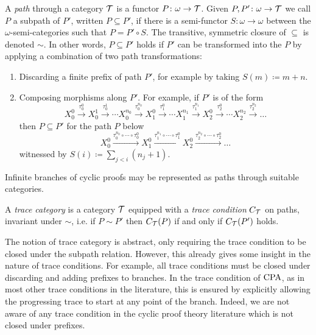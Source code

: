 A \emph{path} through a category $\mathcal{T}$ is a functor $P \colon \omega \to \mathcal{T}$.
Given $P, P' \colon \omega \to \mathcal{T}$ we call $P$ a subpath of $P'$, written  $P \subseteq
  P'$, if there is a semi-functor $S \colon \omega \to \omega$ between the $\omega$-semi-categories such that $P = P'
  \circ S$. The transitive, symmetric closure of $\subseteq$ is
  denoted $\sim$.
In other words, $P \subseteq P'$ holds if $P'$ can be transformed
  into the $P$ by applying a combination of two path transformations:
  \begin{enumerate}
  \item 
    Discarding a finite prefix of path $P'$, for example by taking $S(m) \coloneq m + n$.
  \item 
    Composing morphisms along $P'$. For example, if $P'$ is of the form
    \[X_0^0 \xrightarrow{\tau^0_0} X_0^1 \xrightarrow{\tau^1_0} \cdots
      X_0^{n_0} \xrightarrow{\tau_0^{n_0}} X_1^0 \xrightarrow{\tau_1^0} \cdots X_1^{n_1}
      \xrightarrow{\tau_1^{n_1}} X_2^0 \xrightarrow{\tau_2^0} \cdots X_2^{n_2} \xrightarrow{\tau_2^{n_2}} \hdots\]
    then $P \subseteq P'$ for the path $P$ below
    \[X_0^0 \xrightarrow{\tau^{n_0}_0 \circ \cdots \circ \tau^0_0} X_1^0
      \xrightarrow{\tau^{n_1}_1 \circ \cdots \circ \tau^{0}_1 } X_2^0
      \xrightarrow {\tau^{n_2}_2 \circ \cdots \circ \tau^{0}_2 } \hdots\]
    witnessed by $S(i) \coloneq \sum_{j < i} (n_j + 1)$.
  \end{enumerate}

Infinite branches of cyclic proofs may be represented as paths through suitable categories.

\begin{definition}\label{def:trace-cond}
A \emph{trace category} is a category $\mathcal{T}$ equipped with a \emph{trace
  condition} \( C_{\mathcal{T}} \) on paths, invariant under $\sim$, i.e.
  if $P \sim P'$ then $C_{\mathcal{T}}(P)$ if and only if $C_{\mathcal{T}}(P')$ holds.
\end{definition}

The notion of trace category is abstract, only requiring the trace
condition to be closed under the subpath relation. However, this already gives
some insight in the nature of trace conditions. For example, all trace
conditions must be closed under discarding and adding prefixes to branches. In
the trace condition of $\mathrm{CPA}$, as in most other
trace conditions in the literature, this is ensured by explicitly allowing the
progressing trace to start at any point of the branch. Indeed, we are not aware
of any trace condition in the cyclic proof theory literature which is not closed
under prefixes.


